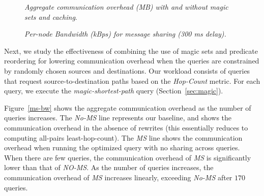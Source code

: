 \begin{figure}[ht]
\centering
 \begin{minipage}{.45\linewidth}
  \begin{center}
    \small{\caption{\label{ms-bw}\emph{\small Aggregate communication overhead (MB) with and
    without magic sets and caching}.}}
    \end{center}
 \end{minipage}
\hfill
 \begin{minipage}{.45\linewidth}
  \begin{center}
    \small{\caption{\label{opportunistic-bw300}\emph{\small
    Per-node Bandwidth (kBps) for message sharing (300 ms delay).}}}
  \end{center}
 \end{minipage}
\end{figure}

Next, we study the effectiveness of combining the use of magic sets
and predicate reordering for lowering communication overhead when the
queries are constrained by randomly chosen sources and
destinations. Our workload consists of queries that request
source-to-destination paths based on the {\em Hop-Count} metric. For
each query, we execute the {\em magic-shortest-path} query
(Section~\ref{sec:magic}). 

Figure~\ref{ms-bw} shows the aggregate communication overhead as the number of
queries increases.  The {\em No-MS} line represents our baseline, and
shows the communication overhead in the absence of rewrites (this
essentially reduces to computing all-pairs least-hop-count). The {\em
MS} line shows the communication overhead when running the optimized
query with no sharing across queries. When there are few queries, the
communication overhead of {\em MS} is significantly lower than that of
{\em NO-MS}. As the number of queries increases, the communication
overhead of {\em MS} increases linearly, exceeding {\em No-MS} after
$170$ queries.

